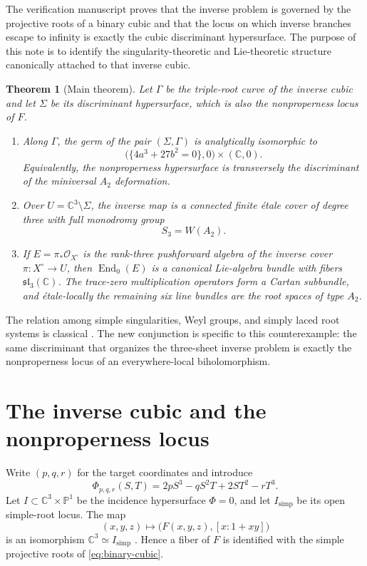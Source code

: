 \documentclass[11pt,reqno]{amsart}
\numberwithin{equation}{section}
\newtheorem{theorem}{Theorem}[section]
\theoremstyle{remark}
\newcommand{\C}{\mathbb C}
\newcommand{\PP}{\mathbb P}
\newcommand{\OO}{\mathcal O}
\newcommand{\End}{\operatorname{End}}
\begin{document}
The verification manuscript proves that the inverse problem is governed by the projective roots of a binary cubic and that the locus on which inverse branches escape to infinity is exactly the cubic discriminant hypersurface. The purpose of this note is to identify the singularity-theoretic and Lie-theoretic structure canonically attached to that inverse cubic.

\begin{theorem}[Main theorem]\label{thm:main}
Let $\Gamma$ be the triple-root curve of the inverse cubic and let $\Sigma$ be its discriminant hypersurface, which is also the nonproperness locus of $F$.
\begin{enumerate}[label=\textup{(\roman*)}]
\item Along $\Gamma$, the germ of the pair $(\Sigma,\Gamma)$ is analytically isomorphic to
\[
\bigl(\{4a^3+27b^2=0\},0\bigr)\times(\C,0).
\]
Equivalently, the nonproperness hypersurface is transversely the discriminant of the miniversal $A_2$ deformation.
\item Over $U=\C^3\setminus\Sigma$, the inverse map is a connected finite étale cover of degree three with full monodromy group
\[
S_3=W(A_2).
\]
\item If $E=\pi_*\OO_{X^\circ}$ is the rank-three pushforward algebra of the inverse cover $\pi:X^\circ\to U$, then $\End_0(E)$ is a canonical Lie-algebra bundle with fibers $\mathfrak{sl}_3(\C)$. The trace-zero multiplication operators form a Cartan subbundle, and étale-locally the remaining six line bundles are the root spaces of type $A_2$.
\end{enumerate}
\end{theorem}

The relation among simple singularities, Weyl groups, and simply laced root systems is classical \cite{Arnold1972,Arnold1974,Brieskorn1970,Slodowy1980}. The new conjunction is specific to this counterexample: the same discriminant that organizes the three-sheet inverse problem is exactly the nonproperness locus of an everywhere-local biholomorphism.

\section{The inverse cubic and the nonproperness locus}

Write $(p,q,r)$ for the target coordinates and introduce
\begin{equation}\label{eq:binary-cubic}
\Phi_{p,q,r}(S,T)=2pS^3-qS^2T+2ST^2-rT^3.
\end{equation}
Let $I\subset\C^3\times\PP^1$ be the incidence hypersurface $\Phi=0$, and let $I_{\mathrm{simp}}$ be its open simple-root locus. The map
\[
(x,y,z)\longmapsto\bigl(F(x,y,z),[x:1+xy]\bigr)
\]
is an isomorphism $\C^3\simeq I_{\mathrm{simp}}$ \cite[Proposition~4.1]{Counterexample2026}. Hence a fiber of $F$ is identified with the simple projective roots of \eqref{eq:binary-cubic}.
\end{document}
